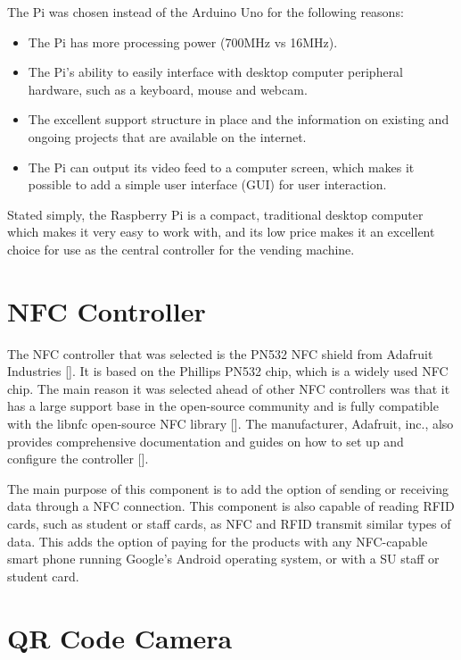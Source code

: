 The Pi was chosen instead of the Arduino Uno for the following reasons:

\begin{itemize}
  
  \item The Pi has more processing power (700MHz vs 16MHz).
  \item The Pi's ability to easily interface with desktop computer peripheral hardware,
  such as a keyboard, mouse and webcam.
  \item The excellent support structure in place and the information on existing and ongoing
  projects that are available on the internet.
  \item The Pi can output its video feed to a computer screen, which makes it possible to
  add a simple user interface (GUI) for user interaction. 

\end{itemize}

Stated simply, the Raspberry Pi is a compact, traditional desktop computer which makes it very
easy to work with, and its low price makes it an excellent choice for use as the central
controller for the vending machine.

\section{NFC Controller}
\label{sec:nfc-controller}

The NFC controller that was selected is the PN532 NFC shield from Adafruit Industries
[\cite{website:adafruit-nfc}]. It is based on
the Phillips PN532 chip, which is a widely used NFC chip. The main reason it was selected ahead
of other NFC controllers was that it has a large support base in the open-source
community and is fully compatible with the libnfc open-source NFC library
[\cite{website:libnfc-hardware}]. The manufacturer, Adafruit, inc., also provides
comprehensive documentation and guides on how to set up and configure the controller
[\cite{website:adafruit-tutorial}].
 
The main purpose of this component is to add the option of sending or receiving data
through a NFC connection.
This component is also capable of reading RFID cards, such as student or staff cards, as
NFC and RFID transmit similar types of data. This adds the option of paying for the products with 
any NFC-capable smart phone running Google's Android operating system, or with a SU staff or
student card.

\section{QR Code Camera}
\label{sec:webcam}

